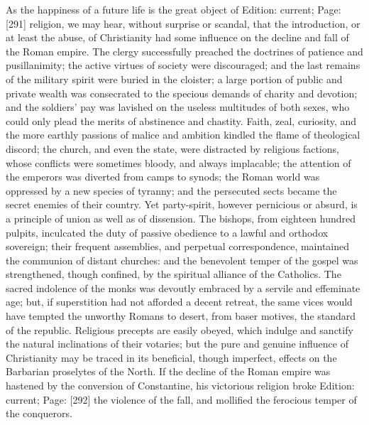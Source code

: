 As the happiness of a future life is the great object of Edition: current; Page: [291] religion, we may hear, without surprise or scandal, that the introduction, or at least the abuse, of Christianity had some influence on the decline and fall of the Roman empire. The clergy successfully preached the doctrines of patience and pusillanimity; the active virtues of society were discouraged; and the last remains of the military spirit were buried in the cloister; a large portion of public and private wealth was consecrated to the specious demands of charity and devotion; and the soldiers\texthebrew{}’ pay was lavished on the useless multitudes of both sexes, who could only plead the merits of abstinence and chastity. Faith, zeal, curiosity, and the more earthly passions of malice and ambition kindled the flame of theological discord; the church, and even the state, were distracted by religious factions, whose conflicts were sometimes bloody, and always implacable; the attention of the emperors was diverted from camps to synods; the Roman world was oppressed by a new species of tyranny; and the persecuted sects became the secret enemies of their country. Yet party-spirit, however pernicious or absurd, is a principle of union as well as of dissension. The bishops, from eighteen hundred pulpits, inculcated the duty of passive obedience to a lawful and orthodox sovereign; their frequent assemblies, and perpetual correspondence, maintained the communion of distant churches: and the benevolent temper of the gospel was strengthened, though confined, by the spiritual alliance of the Catholics. The sacred indolence of the monks was devoutly embraced by a servile and effeminate age; but, if superstition had not afforded a decent retreat, the same vices would have tempted the unworthy Romans to desert, from baser motives, the standard of the republic. Religious precepts are easily obeyed, which indulge and sanctify the natural inclinations of their votaries; but the pure and genuine influence of Christianity may be traced in its beneficial, though imperfect, effects on the Barbarian proselytes of the North. If the decline of the Roman empire was hastened by the conversion of Constantine, his victorious religion broke Edition: current; Page: [292] the violence of the fall, and mollified the ferocious temper of the conquerors.

